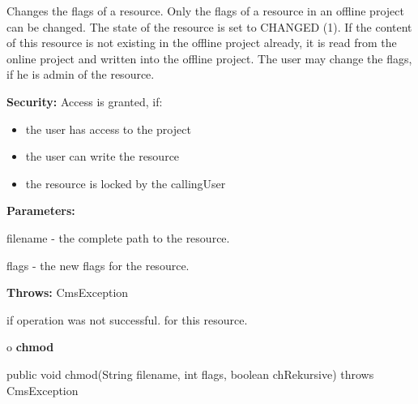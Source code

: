 \begin{description}
\htmlDD Changes the flags of a resource. \htmlBR
Only the flags of a resource in an offline project can be changed. The state
of the resource is set to CHANGED (1). If the content of this resource is not
existing in the offline project already, it is read from the online project
and written into the offline project. The user may change the flags, if he is
admin of the resource. 

{\bf Security:} Access is granted, if: 

\begin{itemize}
\item the user has access to the project 
\item the user can write the resource 
\item the resource is locked by the callingUser 
\end{itemize}

\begin{description}
\item {\bf Parameters:}  

filename - the complete path to the resource.  

flags - the new flags for the resource.  
\item {\bf Throws:} CmsException  

if operation was not successful. for this resource.  
\end{description}

\end{description}

o {\bf chmod} 

\begin{PRE}
 public void chmod(String filename,
                   int flags,
                   boolean chRekursive) throws CmsException
\end{PRE}

